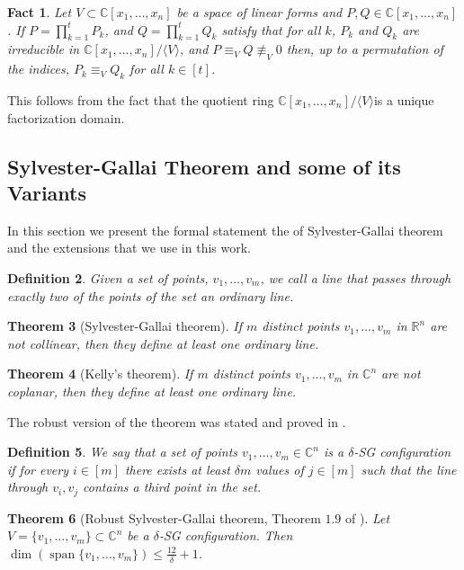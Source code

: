 \documentclass[10pt,a4paper]{article}
\newtheorem{theorem}{Theorem}
\newtheorem{definition}[theorem]{Definition}
\newtheorem{fact}[theorem]{Fact}
\def\Real{\mathbb{R}}
\let\R\Real
\renewcommand{\C}{\mathbb{C}}
\newcommand{\MVar}[2]{{#1}_1,\ldots, {#1}_{#2}}
\newcommand{\PRing}[3]{\mathbb{#1}[ \MVar{#2}{#3}]}
\newcommand{\CRing}[2]{\PRing{C}{#1}{#2}}
\newcommand{\spn}[1]{\operatorname{span}\{{#1}\}}
\begin{document}
\begin{fact}\label{fact:ufd}
Let $V\subset \CRing{x}{n}$ be a space of linear forms and $P,Q\in \CRing{x}{n}$. If $P = \prod_{k=1}^t P_k$, and $Q = \prod_{k=1}^t Q_k$ satisfy that for all $k$, $P_k$ and $Q_k$ are irreducible in $\CRing{x}{n}/{\langle V\rangle}$, and $P \equiv_V Q \not\equiv_V 0$ then, up to a permutation of the indices, $P_k\equiv_V Q_k$ for all $k\in [t]$.
\end{fact}
This follows from the fact that the quotient ring $\CRing{x}{n}/{\langle V\rangle}$is a unique factorization domain.


\subsection{Sylvester-Gallai Theorem and some of its Variants}\label{sec:SGThms}
In this section we present the formal statement the of Sylvester-Gallai theorem and the extensions that we use in this work.

\begin{definition}
Given a set of points, $v_1,\ldots ,v_m$, we call a line that passes through exactly two of the
points of the set an \emph{ordinary line}.
\end{definition}


\begin{theorem}[Sylvester-Gallai theorem]\label{thm:SG}
If $m$ distinct points $v_1,\ldots ,v_m$ in $\R^n$ are not collinear, then they define at least one ordinary line.
\end{theorem}

\begin{theorem}[Kelly's theorem]\label{thm:Kelly}
If $m$ distinct points $v_1,\ldots ,v_m$ in $\C^n$ are not coplanar, then they define at least one ordinary line.
\end{theorem}

The robust version of the theorem was stated and proved in \cite{barak2013fractional,DSW12}.
\begin{definition}\label{def:delta-SGConf}
We say that a set of points $v_1,\ldots ,v_m\in \C^n$ is a \textit{$\delta$-SG configuration} if for every $i\in [m]$ there exists at least $\delta m$ values of $j \in [m]$ such that the line through $v_i,v_j$ contains a third point in the set.
\end{definition}

\begin{theorem}[Robust Sylvester-Gallai theorem, Theorem $1.9$ of \cite{DSW12}]\label{thm:robustSG}
Let $V = \lbrace v_1,\ldots ,v_m\rbrace \subset \C^n$ be a $\delta$-SG configuration. Then $\dim(\spn{v_1,\ldots ,v_m}) \leq \frac{12}{\delta}+1$.
\end{theorem}
\end{document}
